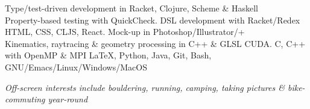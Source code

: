 \documentclass[10pt,a4paper]{article}
\begin{document}
\textcolor{spacergray}{\spacedhrule{0em}{-0.4em}}

    {Type/test-driven development in Racket, Clojure, Scheme \& Haskell \\
    Property-based testing with QuickCheck. DSL development with Racket/Redex}
    {HTML, CSS, CLJS, React. Mock-up in Photoshop/Illustrator/+ \\
    Kinematics, raytracing \& geometry processing in C++ \& GLSL}
    {CUDA. C, C++ with OpenMP \& MPI}
    {\LaTeX, Python, Java, Git, Bash, GNU/Emacs/Linux/Windows/MacOS}


\textcolor{spacergray}{\spacedhrule{0.8em}{1.0em}}%
\emph{Off-screen interests include bouldering, running, camping, taking pictures \& bike-commuting year-round}
\textcolor{spacergray}{\spacedhrule{0.8em}{-0.4em}}
\end{document}
